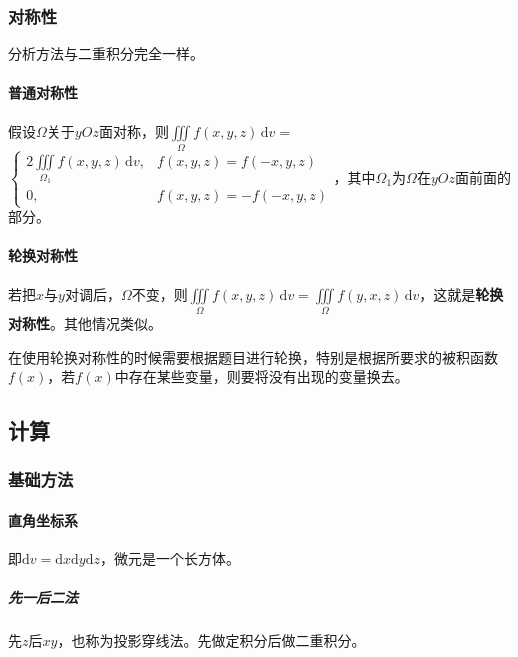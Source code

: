 \documentclass[UTF8, 12pt]{ctexart}
\begin{document}
\subsubsection{对称性}

分析方法与二重积分完全一样。

\paragraph{普通对称性} \leavevmode \medskip

假设$\Omega$关于$yOz$面对称，则$\iiint\limits_\Omega f(x,y,z)\,\textrm{d}v=$\\$\left\{\begin{array}{ll}
    2\iiint\limits_{\Omega_1}f(x,y,z)\,\textrm{d}v, & f(x,y,z)=f(-x,y,z) \\
    0, & f(x,y,z)=-f(-x,y,z)
\end{array}\right.$，其中$\Omega_1$为$\Omega$在$yOz$面前面的部分。

\paragraph{轮换对称性} \leavevmode \medskip

若把$x$与$y$对调后，$\Omega$不变，则$\iiint\limits_\Omega f(x,y,z)\,\textrm{d}v=\iiint\limits_\Omega f(y,x,z)\,\textrm{d}v$，这就是\textbf{轮换对称性}。其他情况类似。

在使用轮换对称性的时候需要根据题目进行轮换，特别是根据所要求的被积函数$f(x)$，若$f(x)$中存在某些变量，则要将没有出现的变量换去。

\subsection{计算}

\subsubsection{基础方法}

\paragraph{直角坐标系} \leavevmode \medskip

即$\textrm{d}v=\textrm{d}x\textrm{d}y\textrm{d}z$，微元是一个长方体。

\subparagraph{先一后二法} \leavevmode \medskip

先$z$后$xy$，也称为投影穿线法。先做定积分后做二重积分。
\end{document}
